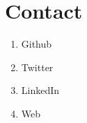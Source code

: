 \section*{Contact}
\begin{enumerate}
  \item Github
  \item Twitter
  \item LinkedIn
  \item Web
\end{enumerate}
